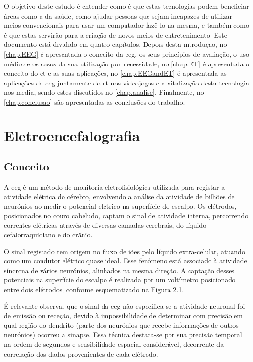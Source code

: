 \documentclass{report}
\begin{document}
O objetivo deste estudo é entender como é que estas tecnologias podem beneficiar áreas como a da saúde, como ajudar pessoas que sejam incapazes de utilizar meios convencionais para usar um computador fazê-lo na mesma, e também como é que estas servirão para a criação de novos meios de entretenimento.
Este documento está dividido em quatro capítulos. Depois desta introdução, no \autoref{chap.EEG} é apresentada o conceito da \ac{eeg}, os seus princípios de avaliação, o uso médico e os casos da sua utilização por necessidade,  no \autoref{chap.ET} é apresentada o conceito do \ac{et} e as suas aplicações, no \autoref{chap.EEGandET} é apresentada as aplicações da \ac{eeg} juntamente do \ac{et} nos videojogos e a vitalização desta tecnologia nos media, sendo estes discutidos no \autoref{chap.analise}. Finalmente, no \autoref{chap.conclusao} são apresentadas
as conclusões do trabalho.

\chapter{Eletroencefalografia}
\label{chap.EEG}


\section{Conceito}
A \ac{eeg} é um método de monitoria eletrofisiológica utilizada para registar a atividade elétrica do cérebro, envolvendo a análise da atividade de bilhões de neurónios ao medir o potencial elétrico na superfície do escalpo.\cite{Eletroencefalografia} Os elétrodos, posicionados no couro cabeludo, captam o sinal de atividade interna, percorrendo correntes elétricas através de diversas camadas cerebrais, do líquido cefalorraquidiano e do crânio.

O sinal registado tem origem no fluxo de iões pelo líquido extra-celular, atuando como um condutor elétrico quase ideal. Esse fenómeno está associado à atividade síncrona de vários neurónios, alinhados na mesma direção. A captação desses potenciais na superfície do escalpo é realizada por um voltímetro posicionado entre dois elétrodos, conforme esquematizado na Figura 2.1.

É relevante observar que o sinal da \ac{eeg} não especifica se a atividade neuronal foi de emissão ou receção, devido à impossibilidade de determinar com precisão em qual região do dendrito (parte dos neurónios que recebe informações de outros neurónios) ocorreu a sinapse. Essa técnica destaca-se por sua precisão temporal na ordem de segundos e sensibilidade espacial considerável, decorrente da correlação dos dados provenientes de cada elétrodo.
\end{document}
